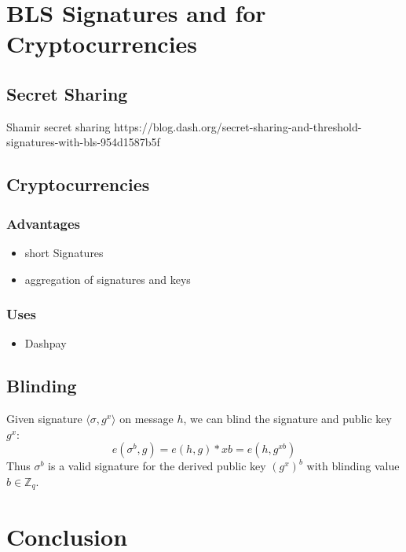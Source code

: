 \documentclass[a4paper,12pt]{scrartcl}
\begin{document}
\pagebreak

\section{BLS Signatures and for Cryptocurrencies}
\subsection{Secret Sharing}
Shamir secret sharing https://blog.dash.org/secret-sharing-and-threshold-signatures-with-bls-954d1587b5f
\subsection{Cryptocurrencies}
\subsubsection{Advantages}
\begin{itemize}
	\item short Signatures
	\item aggregation of signatures and keys
\end{itemize}

\subsubsection{Uses}
\begin{itemize}
	\item Dashpay
\end{itemize}

\subsection{Blinding}
Given signature \( \langle \sigma, g^x \rangle \) on message \( h \), we can blind the signature and public key \( g^x \):
\[ e(\sigma^b,g) = e(h,g)*{xb} = e(h,g^{xb}) \]
Thus \( \sigma^b \) is a valid signature for the derived public key \( (g^x)^b \) with blinding value \( b \in \mathbb{Z}_{q} \).\cite[PKI Slide 12]{crypto-slides-grothoff}
\pagebreak

\section{Conclusion}

\printbibliography
\end{document}
